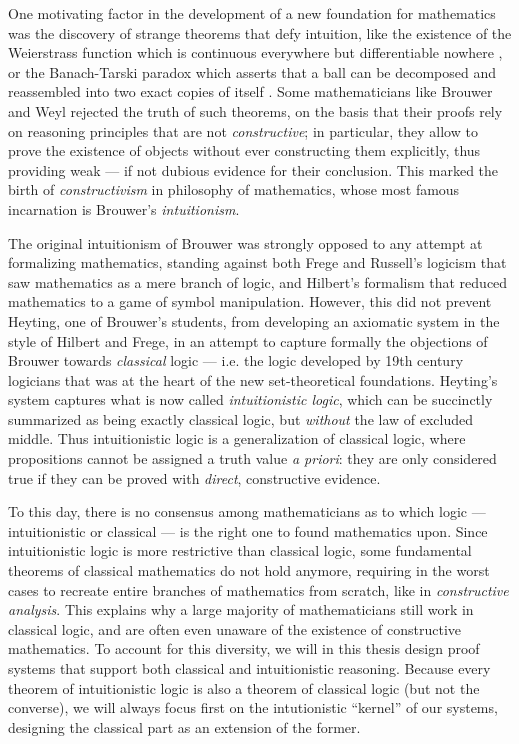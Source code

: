 One motivating factor in the development of a new foundation for mathematics
was the discovery of strange theorems that defy intuition, like the existence of
the Weierstrass function which is continuous everywhere but differentiable
nowhere , or the Banach-Tarski paradox which
asserts that a ball can be decomposed and reassembled into two exact copies of
itself . Some mathematicians like Brouwer and Weyl
rejected the truth of such theorems, on the basis that their proofs rely on
reasoning principles that are not \emph{constructive}; in particular, they allow
to prove the existence of objects without ever constructing them explicitly,
thus providing weak --- if not dubious evidence for their conclusion. This
marked the birth of \emph{constructivism} in philosophy of mathematics, whose
most famous incarnation is Brouwer's \emph{intuitionism}.

The original intuitionism of Brouwer was strongly opposed to any attempt at
formalizing mathematics, standing against both Frege and Russell's logicism that
saw mathematics as a mere branch of logic, and Hilbert's formalism that reduced
mathematics to a game of symbol manipulation. However, this did not prevent
Heyting, one of Brouwer's students, from developing an axiomatic system in the
style of Hilbert and Frege, in an attempt to capture formally the objections of
Brouwer towards \emph{classical} logic --- i.e. the logic developed by 19th
century logicians that was at the heart of the new set-theoretical foundations.
Heyting's system captures what is now called \emph{intuitionistic logic}, which
can be succinctly summarized as being exactly classical logic, but
\emph{without} the law of excluded middle. Thus intuitionistic logic is a
generalization of classical logic, where propositions cannot be assigned a truth
value \emph{a priori}: they are only considered true if they can be proved with
\emph{direct}, constructive evidence.

To this day, there is no consensus among mathematicians as to which logic ---
intuitionistic or classical --- is the right one to found mathematics upon.
Since intuitionistic logic is more restrictive than classical logic, some
fundamental theorems of classical mathematics do not hold anymore, requiring in
the worst cases to recreate entire branches of mathematics from scratch, like in
\emph{constructive analysis}. This explains why a large majority of
mathematicians still work in classical logic, and are often even unaware of the
existence of constructive mathematics. To account for this diversity, we will in
this thesis design proof systems that support both classical and intuitionistic
reasoning. Because every theorem of intuitionistic logic is also a theorem of
classical logic (but not the converse), we will always focus first on the
intutionistic ``kernel'' of our systems, designing the classical part as an
extension of the former.

